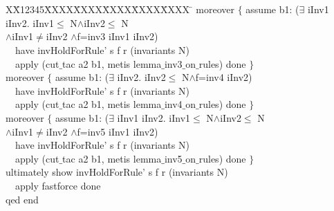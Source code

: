 \documentclass[final]{IEEEtran}
\newlength{\fminilength}
\newenvironment{fmini}[1][\linewidth]
  {\setlength{\fminilength}{#1\fboxsep-2\fboxrule}%
   \vspace{2ex}\noindent\begin{lrbox}{\fminibox}\begin{minipage}{\fminilength}%
   \mbox{ }\hfill\vspace{-2.5ex}}%
  {\end{minipage}\end{lrbox}\vspace{1ex}\hspace{0ex}%
   \framebox{\usebox{\fminibox}}}
\newenvironment{specification}
{\noindent\scriptsize
\tt\begin{fmini}\begin{tabbing}X\=X12345\=XXXX\=XXXX\=XXXX\=XXXX\=XXXX
\=\+\kill} {\end{tabbing}\normalfont\end{fmini}}
\def \twoSpaces {\ \ }
\def \iInv {iInv}
\begin{document}
\begin{specification}
    moreover $\{$      assume b1:
($\exists$ \iInv1 \iInv2. \iInv1$\le$
N$\wedge$\iInv2$\le$ N\\
$\wedge$\iInv1$\neq$\iInv2
$\wedge$f=inv3  \iInv1 \iInv2)\\

\twoSpaces       have
invHoldForRule' s f r (invariants N)\\

\twoSpaces      apply (cut$\_$tac a2 b1, metis lemma$\_$inv3$\_$on$\_$rules) done
    $\}$\\


    moreover $\{$      assume b1:
($\exists$ \iInv2. \iInv2$\le$
N$\wedge$f=inv4  \iInv2)\\

\twoSpaces       have
invHoldForRule' s f r (invariants N)\\

\twoSpaces      apply (cut$\_$tac a2 b1, metis lemma$\_$inv4$\_$on$\_$rules) done
    $\}$\\


    moreover $\{$
      assume b1:
($\exists$ \iInv1 \iInv2. \iInv1$\le$
N$\wedge$\iInv2$\le$ N\\
$\wedge$\iInv1$\neq$\iInv2
$\wedge$f=inv5  \iInv1 \iInv2)\\

\twoSpaces       have
invHoldForRule' s f r (invariants N)\\

\twoSpaces      apply (cut$\_$tac a2 b1, metis lemma$\_$inv5$\_$on$\_$rules) done
    $\}$\\


  ultimately show
invHoldForRule' s f r (invariants N)\\

\twoSpaces  apply fastforce done\\
qed
end\\
\end{specification}



\end{document}
